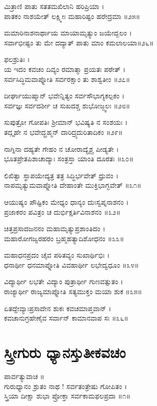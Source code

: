 ಮಿತ್ರಾಣಿ ಪಾತು ಸತತಮಖಿಲಾನಿ ಹರಿಪ್ರಿಯಾ ।\\
ಪಾತಕಂ ನಾಶಯೇತ್ ಲಕ್ಷ್ಮೀಃ ಮಹಾರಿಷ್ಟಂ ಹರೇದ್ರಮಾ ॥೨೫॥

ಮಮಾರಿನಾಶನಾರ್ಥಾಯ ಮಾಯಾಮೃತ್ಯುಂ ಜಯೇದ್ಬಲಂ ।\\
ಸರ್ವಾಭೀಷ್ಟಂ ತು ಮೇ ದದ್ಯಾತ್ ಪಾತು ಮಾಂ ಕಮಲಾಲಯಾ॥೨೬॥

ಫಲಶ್ರುತಿಃ ।\\
ಯ ಇದಂ ಕವಚಂ ದಿವ್ಯಂ ರಮಾತ್ಮಾ ಪ್ರಯತಃ ಪಠೇತ್ ।\\
ಸರ್ವಸಿದ್ಧಿಮವಾಪ್ನೋತಿ ಸರ್ವರಕ್ಷಾಂ ತು ಶಾಶ್ವತೀಂ ॥೨೭॥

ದೀರ್ಘಾಯುಷ್ಮಾನ್ ಭವೇನ್ನಿತ್ಯಂ ಸರ್ವಸೌಭಾಗ್ಯಕಲ್ಪಕಂ ।\\
ಸರ್ವಜ್ಞಃ ಸರ್ವದರ್ಶೀ ಚ ಸುಖದಶ್ಚ ಶುಭೋಜ್ಜ್ವಲಃ ॥೨೮॥

ಸುಪುತ್ರೋ ಗೋಪತಿಃ ಶ್ರೀಮಾನ್ ಭವಿಷ್ಯತಿ ನ ಸಂಶಯಃ ।\\
ತದ್ಗೃಹೇ ನ ಭವೇದ್ಬ್ರಹ್ಮನ್ ದಾರಿದ್ರ್ಯದುರಿತಾದಿಕಂ ॥೨೯॥

ನಾಗ್ನಿನಾ ದಹ್ಯತೇ ಗೇಹಂ ನ ಚೋರಾದ್ಯೈಶ್ಚ ಪೀಡ್ಯತೇ ।\\
ಭೂತಪ್ರೇತಪಿಶಾಚಾದ್ಯಾಃ ಸಂತ್ರಸ್ತಾ ಯಾಂತಿ ದೂರತಃ ॥೩೦॥

ಲಿಖಿತ್ವಾ ಸ್ಥಾಪಯೇದ್ಯತ್ರ ತತ್ರ ಸಿದ್ಧಿರ್ಭವೇತ್ ಧ್ರುವಂ ।\\
ನಾಪಮೃತ್ಯುಮವಾಪ್ನೋತಿ ದೇಹಾಂತೇ ಮುಕ್ತಿಭಾಗ್ಭವೇತ್ ॥೩೧॥

ಆಯುಷ್ಯಂ ಪೌಷ್ಟಿಕಂ ಮೇಧ್ಯಂ ಧಾನ್ಯಂ ದುಃಸ್ವಪ್ನನಾಶನಂ ।\\
ಪ್ರಜಾಕರಂ ಪವಿತ್ರಂ ಚ ದುರ್ಭಿಕ್ಷರ್ತಿವಿನಾಶನಂ ॥೩೨॥

ಚಿತ್ತಪ್ರಸಾದಜನನಂ ಮಹಾಮೃತ್ಯುಪ್ರಶಾಂತಿದಂ ।\\
ಮಹಾರೋಗಜ್ವರಹರಂ ಬ್ರಹ್ಮಹತ್ಯಾದಿಶೋಧನಂ ॥೩೩॥

ಮಹಾಧನಪ್ರದಂ ಚೈವ ಪಠಿತವ್ಯಂ ಸುಖಾರ್ಥಿಭಿಃ ।\\
ಧನಾರ್ಥೀ ಧನಮಾಪ್ನೋತಿ ವಿವಹಾರ್ಥೀ ಲಭೇದ್ವಧೂಂ ॥೩೪॥

ವಿದ್ಯಾರ್ಥೀ ಲಭತೇ ವಿದ್ಯಾಂ ಪುತ್ರಾರ್ಥೀ ಗುಣವತ್ಸುತಂ ।\\
ರಾಜ್ಯಾರ್ಥೀ ರಾಜ್ಯಮಾಪ್ನೋತಿ ಸತ್ಯಮುಕ್ತಂ ಮಯಾ ಶುಕ ॥೩೫॥

ಏತದ್ದೇವ್ಯಾಃಪ್ರಸಾದೇನ ಶುಕಃ ಕವಚಮಾಪ್ತವಾನ್ ।\\
ಕವಚಾನುಗ್ರಹೇಣೈವ ಸರ್ವಾನ್ ಕಾಮಾನವಾಪ ಸಃ ॥೩೬॥

\section{ಸ್ತ್ರೀಗುರು ಧ್ಯಾನಸ್ತುತೀಕವಚಂ}


ಪಾರ್ವತ್ಯುವಾಚ ॥\\
ಗುರುಧ್ಯಾನಂ ಶ್ರುತಂ ನಾಥ ! ಸರ್ವತಂತ್ರೇಷು ಗೋಪಿತಂ ।\\
ಸ್ತ್ರಿಯಾ ದೀಕ್ಷಾ ಶುಭಾ ಪ್ರೋಕ್ತಾ ಸರ್ವಕಾಮಫಲಪ್ರದಾ ॥೧॥

